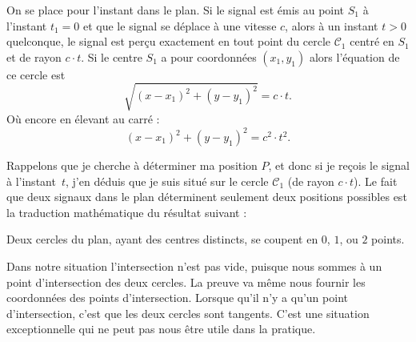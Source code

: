 \documentclass[class=report,crop=false]{standalone}
\begin{document}
On se place pour l'instant dans le plan. Si le signal est émis au point $S_1$
à l'instant $t_1=0$ et que le signal se déplace à une vitesse $c$, alors à un instant $t>0$ quelconque,
le signal est perçu exactement en tout point du cercle $\mathcal{C}_1$ centré en $S_1$ et de rayon $c \cdot t$.
Si le centre $S_1$ a pour coordonnées $(x_1,y_1)$ alors l'équation de ce cercle est
$$\sqrt{(x-x_1)^2 + (y-y_1)^2} = c \cdot t.$$
Où encore en élevant au carré :
$$(x-x_1)^2 + (y-y_1)^2 = c^2 \cdot t^2.$$

Rappelons que je cherche à déterminer ma position $P$, et donc si je reçois le signal 
à l'instant~$t$, j'en déduis que je suis situé sur le cercle $\mathcal{C}_1$ (de rayon $c\cdot t$).
Le fait que deux signaux dans le plan déterminent seulement deux positions possibles 
est la traduction mathématique du résultat suivant :
\begin{proposition}
Deux cercles du plan, ayant des centres distincts, se coupent en $0$, $1$, ou $2$ points.  
\end{proposition}


Dans notre situation l'intersection n'est pas vide, puisque nous sommes
à un point d'intersection des deux cercles.
La preuve va même nous fournir les coordonnées des points d'intersection.
Lorsque qu'il n'y a qu'un point d'intersection, c'est que les deux cercles sont tangents.
C'est une situation exceptionnelle qui ne peut pas nous être utile dans la pratique.
\end{document}
